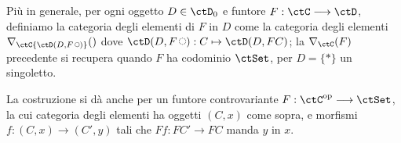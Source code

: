 Più in generale, per ogni oggetto \(D\in\ctD_0\) e funtore \(F : \ctC\fun\ctD\), definiamo la categoria degli elementi di \(F\) in \(D\) come la categoria degli elementi \(\Elts\ctC{\Hom\ctD(D,F\blank)}\) dove \(\Hom\ctD(D,F\blank) : C\mapsto\Hom\ctD(D,FC)\); la \(\Elts\ctC F\) precedente si recupera quando \(F\) ha codominio \(\ctSet\), per \(D=\{*\}\) un singoletto.

La costruzione si dà anche per un funtore controvariante \(F : \ctC^\op\fun\ctSet\), la cui categoria degli elementi ha oggetti \((C,x)\) come sopra, e morfismi \(f : (C,x)\to (C',y)\) tali che \(Ff : FC'\to FC\) manda \(y\) in \(x\).
